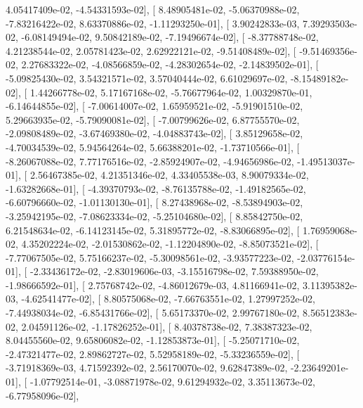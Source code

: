 \documentclass{article}
\begin{document}
          4.05417409e-02,  -4.54331593e-02],
       [  8.48905481e-02,  -5.06370988e-02,  -7.83216422e-02,
          8.63370886e-02,  -1.11293250e-01],
       [  3.90242833e-03,   7.39293503e-02,  -6.08149494e-02,
          9.50842189e-02,  -7.19496674e-02],
       [ -8.37788748e-02,   4.21238544e-02,   2.05781423e-02,
          2.62922121e-02,  -9.51408489e-02],
       [ -9.51469356e-02,   2.27683322e-02,  -4.08566859e-02,
         -4.28302654e-02,  -2.14839502e-01],
       [ -5.09825430e-02,   3.54321571e-02,   3.57040444e-02,
          6.61029697e-02,  -8.15489182e-02],
       [  1.44266778e-02,   5.17167168e-02,  -5.76677964e-02,
          1.00329870e-01,  -6.14644855e-02],
       [ -7.00614007e-02,   1.65959521e-02,  -5.91901510e-02,
          5.29663935e-02,  -5.79090081e-02],
       [ -7.00799626e-02,   6.87755570e-02,  -2.09808489e-02,
         -3.67469380e-02,  -4.04883743e-02],
       [  3.85129658e-02,  -4.70034539e-02,   5.94564264e-02,
          5.66388201e-02,  -1.73710566e-01],
       [ -8.26067088e-02,   7.77176516e-02,  -2.85924907e-02,
         -4.94656986e-02,  -1.49513037e-01],
       [  2.56467385e-02,   4.21351346e-02,   4.33405538e-03,
          8.90079334e-02,  -1.63282668e-01],
       [ -4.39370793e-02,  -8.76135788e-02,  -1.49182565e-02,
         -6.60796660e-02,  -1.01130130e-01],
       [  8.27438968e-02,  -8.53894903e-02,  -3.25942195e-02,
         -7.08623334e-02,  -5.25104680e-02],
       [  8.85842750e-02,   6.21548634e-02,  -6.14123145e-02,
          5.31895772e-02,  -8.83066895e-02],
       [  1.76959068e-02,   4.35202224e-02,  -2.01530862e-02,
         -1.12204890e-02,  -8.85073521e-02],
       [ -7.77067505e-02,   5.75166237e-02,  -5.30098561e-02,
         -3.93577223e-02,  -2.03776154e-01],
       [ -2.33436172e-02,  -2.83019606e-03,  -3.15516798e-02,
          7.59388950e-02,  -1.98666592e-01],
       [  2.75768742e-02,  -4.86012679e-03,   4.81166941e-02,
          3.11395382e-03,  -4.62541477e-02],
       [  8.80575068e-02,  -7.66763551e-02,   1.27997252e-02,
         -7.44938034e-02,  -6.85431766e-02],
       [  5.65173370e-02,   2.99767180e-02,   8.56512383e-02,
          2.04591126e-02,  -1.17826252e-01],
       [  8.40378738e-02,   7.38387323e-02,   8.04455560e-02,
          9.65806082e-02,  -1.12853873e-01],
       [ -5.25071710e-02,  -2.47321477e-02,   2.89862727e-02,
          5.52958189e-02,  -5.33236559e-02],
       [ -3.71918369e-03,   4.71592392e-02,   2.56170070e-02,
          9.62847389e-02,  -2.23649201e-01],
       [ -1.07792514e-01,  -3.08871978e-02,   9.61294932e-02,
          3.35113673e-02,  -6.77958096e-02],
\end{document}
